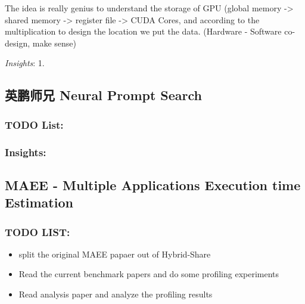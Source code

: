 \documentclass[8pt,UTF8]{article}
\begin{document}
            The idea is really genius to understand the storage of GPU (global memory -> shared memory -> register file -> CUDA Cores, and according to the multiplication to design the location we put the data. (Hardware - Software co-design, make sense)
            
            
            \emph{Insights}:
            1. 
    
    \subsection{英鹏师兄 Neural Prompt Search}
        \subsubsection{TODO List:}
        \subsubsection{Insights:}
    
    \subsection{MAEE - Multiple Applications Execution time Estimation}
        \subsubsection{TODO LIST:}
            \begin{itemize}
                \item split the original MAEE papaer out of Hybrid-Share
                \item Read the current benchmark papers and do some profiling experiments
                \item Read analysis paper and analyze the profiling results
            \end{itemize}
\end{document}
